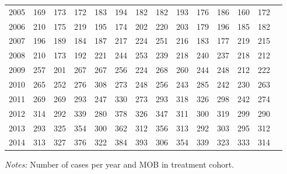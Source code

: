 \begin{table}[H]
\begin{threeparttable}
{\begin{tabular}{l*{13}{c}}
2005        &         169&         173&         172&         183&         194&         182&         182&         193&         176&         186&         160&         172\\
2006        &         210&         175&         219&         195&         174&         202&         220&         203&         179&         196&         185&         182\\
2007        &         196&         189&         184&         187&         217&         224&         251&         216&         183&         177&         219&         215\\
2008        &         210&         173&         192&         221&         244&         253&         239&         218&         240&         237&         218&         212\\
2009        &         257&         201&         267&         267&         256&         224&         268&         260&         244&         248&         212&         222\\
2010        &         265&         252&         276&         308&         273&         248&         256&         243&         285&         242&         230&         263\\
2011        &         269&         269&         293&         247&         330&         273&         293&         318&         326&         298&         242&         274\\
2012        &         314&         292&         339&         280&         378&         326&         347&         311&         300&         319&         299&         290\\
2013        &         293&         325&         354&         300&         362&         312&         356&         313&         292&         303&         295&         312\\
2014        &         313&         327&         376&         322&         384&         393&         306&         354&         339&         323&         333&         314\\
 \bottomrule \end{tabular} } \begin{tablenotes} \item \scriptsize \emph{Notes:} Number of cases per year and MOB in treatment cohort. \end{tablenotes} \end{threeparttable} \end{table} 
